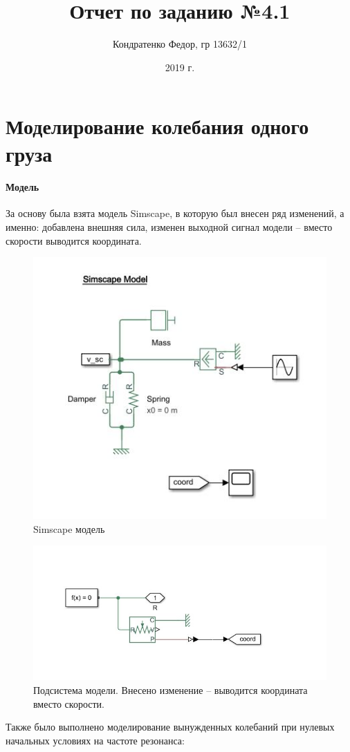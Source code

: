 \documentclass{article}
\date{2019 г.}
\author{Кондратенко Федор, гр 13632/1}
\title{Отчет по заданию №4.1}
\begin{document}
	\maketitle
	\section*{Моделирование колебания одного груза}
	\paragraph*{Модель\\}
	За основу была взята модель Simscape, в которую был внесен ряд изменений, а именно: добавлена внешняя сила, изменен выходной сигнал модели -- вместо скорости выводится координата.
	\begin{figure}[H]
		\centering
		\includegraphics[width=0.7\linewidth]{sx_1_mod}
		\caption{Simscape модель}
		\label{fig:sx1mod}
	\end{figure}
	\begin{figure}[H]
		\centering
		\includegraphics[width=0.7\linewidth]{sx_1_bs}
		\caption{Подсистема модели. Внесено изменение -- выводится координата вместо скорости.}
		\label{fig:sx1bs}
	\end{figure}
	Также было выполнено моделирование вынужденных колебаний при нулевых начальных условиях на частоте резонанса:
\end{document}
